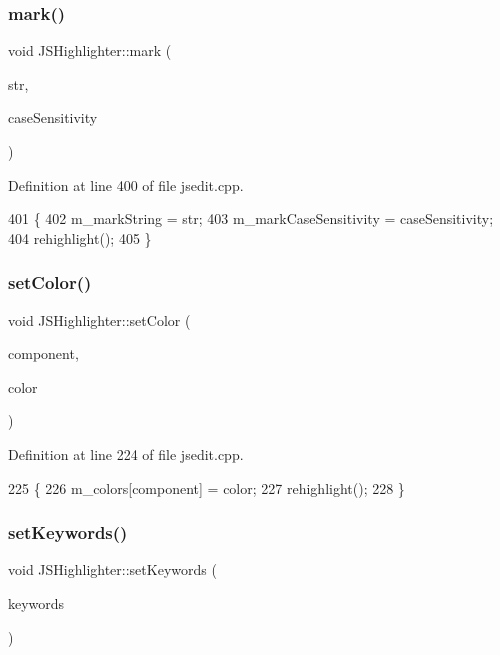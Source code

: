 \subsubsection{\texorpdfstring{mark()}{mark()}}
{\footnotesize\ttfamily void J\+S\+Highlighter\+::mark (\begin{DoxyParamCaption}\item[{const Q\+String \&}]{str,  }\item[{Qt\+::\+Case\+Sensitivity}]{case\+Sensitivity }\end{DoxyParamCaption})}



Definition at line 400 of file jsedit.\+cpp.


\begin{DoxyCode}
401 \{
402     m\_markString = str;
403     m\_markCaseSensitivity = caseSensitivity;
404     rehighlight();
405 \}
\end{DoxyCode}
\mbox{\label{class_j_s_highlighter_a19b04c73d5d10e9eb9bb0acccaa85886}} 
\subsubsection{\texorpdfstring{set\+Color()}{setColor()}}
{\footnotesize\ttfamily void J\+S\+Highlighter\+::set\+Color (\begin{DoxyParamCaption}\item[{\hyperlink{class_j_s_edit_a5a465193a1344e5be9b04f5ff7883213}{J\+S\+Edit\+::\+Color\+Component}}]{component,  }\item[{const Q\+Color \&}]{color }\end{DoxyParamCaption})}



Definition at line 224 of file jsedit.\+cpp.


\begin{DoxyCode}
225 \{
226     m\_colors[component] = color;
227     rehighlight();
228 \}
\end{DoxyCode}
\mbox{\label{class_j_s_highlighter_ad8409e0cec9cd61dd4667c2e5b714c12}} 
\subsubsection{\texorpdfstring{set\+Keywords()}{setKeywords()}}
{\footnotesize\ttfamily void J\+S\+Highlighter\+::set\+Keywords (\begin{DoxyParamCaption}\item[{const Q\+String\+List \&}]{keywords }\end{DoxyParamCaption})}



